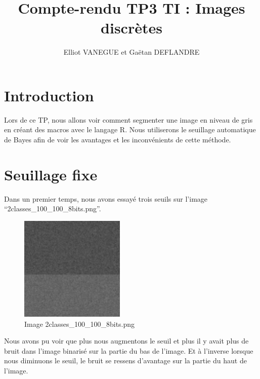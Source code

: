 \documentclass[a4paper,11pt]{article}
\title{Compte-rendu TP3 TI : Images discrètes}
\author{Elliot VANEGUE et Gaëtan DEFLANDRE}
\begin{document}


  \maketitle
  
  \mbox{}
  \newpage
  \clearpage
  
  \section*{Introduction}
  Lors de ce TP, nous allons voir comment segmenter une image en niveau de gris en 
  créant des macros avec le langage R. Nous utiliserons le seuillage automatique 
  de Bayes afin de voir les avantages et les inconvénients de cette méthode.

  \section{Seuillage fixe}
  Dans un premier temps, nous avons essayé trois seuils sur l'image \enquote{2classes\_100\_100\_8bits.png}.\\
  
  \begin{figure}[H]
    \center
    \includegraphics[width=5cm]{2classes_100_100_8bits.png}
    \caption{Image 2classes\_100\_100\_8bits.png}
  \end{figure}
  
  Nous avons pu voir que plus nous augmentons le seuil et plus il y avait plus de bruit dans l'image
  binarisé sur la partie du bas de l'image. Et à l'inverse lorsque nous diminuons le seuil, le bruit 
  se ressens d'avantage sur la partie du haut de l'image.\\
  
\end{document}
